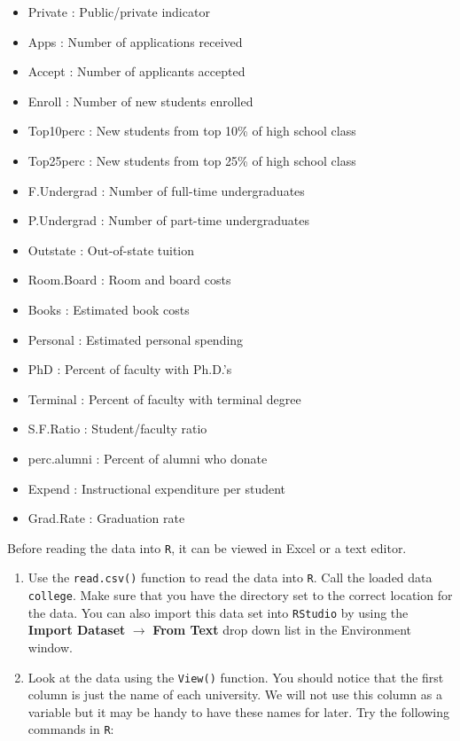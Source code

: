 \documentclass[
]{article}
\providecommand{\tightlist}{%
  \setlength{\itemsep}{0pt}\setlength{\parskip}{0pt}}
\begin{document}
\begin{itemize}
\tightlist
\item
  Private : Public/private indicator
\item
  Apps : Number of applications received
\item
  Accept : Number of applicants accepted
\item
  Enroll : Number of new students enrolled
\item
  Top10perc : New students from top 10\% of high school class
\item
  Top25perc : New students from top 25\% of high school class
\item
  F.Undergrad : Number of full-time undergraduates
\item
  P.Undergrad : Number of part-time undergraduates
\item
  Outstate : Out-of-state tuition
\item
  Room.Board : Room and board costs
\item
  Books : Estimated book costs
\item
  Personal : Estimated personal spending
\item
  PhD : Percent of faculty with Ph.D.'s
\item
  Terminal : Percent of faculty with terminal degree
\item
  S.F.Ratio : Student/faculty ratio
\item
  perc.alumni : Percent of alumni who donate
\item
  Expend : Instructional expenditure per student
\item
  Grad.Rate : Graduation rate
\end{itemize}

Before reading the data into \texttt{R}, it can be viewed in Excel or a
text editor.

\begin{enumerate}
\def\labelenumi{\alph{enumi})}
\item
  Use the \texttt{read.csv()} function to read the data into \texttt{R}.
  Call the loaded data \texttt{college}. Make sure that you have the
  directory set to the correct location for the data. You can also
  import this data set into \texttt{RStudio} by using the \textbf{Import
  Dataset} \(\rightarrow\) \textbf{From Text} drop down list in the
  Environment window.
\item
  Look at the data using the \texttt{View()} function. You should notice
  that the first column is just the name of each university. We will not
  use this column as a variable but it may be handy to have these names
  for later. Try the following commands in \texttt{R}:
\end{enumerate}
\end{document}
